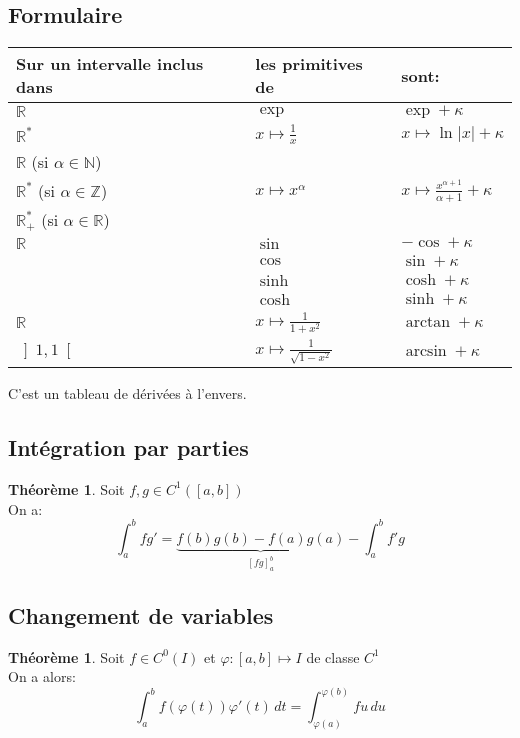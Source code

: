 \documentclass[10pt,a4paper]{article}
\theoremstyle{definition}
\newtheorem{theorem}[proposition]{Théorème}
\begin{document}
\subsection{Formulaire}
\begin{center}
\begin{tabular}{ M{14em} M{14em} M{14em} }
Sur un intervalle inclus dans & les primitives de & sont: \\
\hline
$\mathbb{R}$ & $\exp$ & $\exp + \kappa$ \\
\hline
$\mathbb{R}^*$ & $x \mapsto \frac{1}{x}$ & $x \mapsto \ln|x| + \kappa$ \\
\hline
$\mathbb{R}$ (si $\alpha \in \mathbb{N}$) & & \\
$\mathbb{R}^*$ (si $\alpha \in \mathbb{Z}$) & $x \mapsto x^\alpha$ & $x \mapsto \frac{x^{\alpha + 1}}{\alpha + 1} + \kappa$ \\
$\mathbb{R}_+^*$ (si $\alpha \in \mathbb{R}$) & & \\
\hline
$\mathbb{R}$ & $\sin$ & $-\cos + \kappa$ \\
& $\cos$ & $\sin + \kappa$ \\
& $\sinh$ & $\cosh + \kappa$ \\
& $\cosh$ & $\sinh + \kappa$ \\
\hline
$\mathbb{R}$ & $x \mapsto \frac{1}{1 + x^2}$ & $\arctan + \kappa$ \\
\hline
$\left] 1, 1 \right[$ & $x \mapsto \frac{1}{\sqrt{1 - x^2}}$ & $\arcsin + \kappa$
\end{tabular}
\end{center}
C'est un tableau de dérivées à l'envers.

\subsection{Intégration par parties}
\begin{theorem}
Soit $f, g \in C^1([a, b])$ \\
On a:
\[ \int_a^b f g' = \underbrace{f(b)g(b) - f(a)g(a)}_{\left[fg\right]_a^b} - \int_a^b f' g\]
\end{theorem}

\subsection{Changement de variables}
\begin{theorem}
Soit $f \in C^0(I)$ et $\varphi : [a, b] \mapsto I$ de classe $C^1$ \\
On a alors:
\[ \int_a^b f( \varphi(t)) \varphi'(t) \, dt = \int_{\varphi(a)}^{\varphi(b)} fu \, du\]
\end{theorem}
\end{document}
